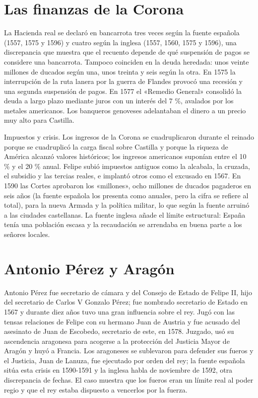 \documentclass{book}
\begin{document}
\section{Las finanzas de la Corona}

La Hacienda real se declaró en bancarrota tres veces según la fuente española (1557, 1575 y 1596) y cuatro según la inglesa (1557, 1560, 1575 y 1596), una discrepancia que muestra que el recuento depende de qué suspensión de pagos se considere una bancarrota. Tampoco coinciden en la deuda heredada: unos veinte millones de ducados según una, unos treinta y seis según la otra. En 1575 la interrupción de la ruta lanera por la guerra de Flandes provocó una recesión y una segunda suspensión de pagos. En 1577 el «Remedio General» consolidó la deuda a largo plazo mediante juros con un interés del 7 \%, avalados por los metales americanos. Los banqueros genoveses adelantaban el dinero a un precio muy alto para Castilla.


Impuestos y crisis. Los ingresos de la Corona se cuadruplicaron durante el reinado porque se cuadruplicó la carga fiscal sobre Castilla y porque la riqueza de América alcanzó valores históricos; los ingresos americanos suponían entre el 10 \% y el 20 \% anual. Felipe subió impuestos antiguos como la alcabala, la cruzada, el subsidio y las tercias reales, e implantó otros como el excusado en 1567. En 1590 las Cortes aprobaron los «millones», ocho millones de ducados pagaderos en seis años (la fuente española los presenta como anuales, pero la cifra se refiere al total), para la nueva Armada y la política militar, lo que según la fuente arruinó a las ciudades castellanas. La fuente inglesa añade el límite estructural: España tenía una población escasa y la recaudación se arrendaba en buena parte a los señores locales.


\section{Antonio Pérez y Aragón}

Antonio Pérez fue secretario de cámara y del Consejo de Estado de Felipe II, hijo del secretario de Carlos V Gonzalo Pérez; fue nombrado secretario de Estado en 1567 y durante diez años tuvo una gran influencia sobre el rey. Jugó con las tensas relaciones de Felipe con su hermano Juan de Austria y fue acusado del asesinato de Juan de Escobedo, secretario de este, en 1578. Juzgado, usó su ascendencia aragonesa para acogerse a la protección del Justicia Mayor de Aragón y huyó a Francia. Los aragoneses se sublevaron para defender sus fueros y el Justicia, Juan de Lanuza, fue ejecutado por orden del rey; la fuente española sitúa esta crisis en 1590-1591 y la inglesa habla de noviembre de 1592, otra discrepancia de fechas. El caso muestra que los fueros eran un límite real al poder regio y que el rey estaba dispuesto a vencerlos por la fuerza.
\end{document}
